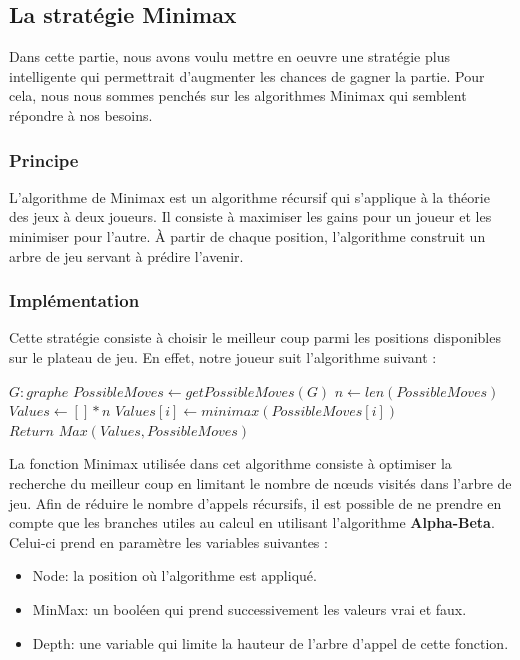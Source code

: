 \documentclass{article}
\begin{document}
\subsection{La stratégie Minimax}
Dans cette partie, nous avons voulu mettre en oeuvre une stratégie plus intelligente qui permettrait d'augmenter les chances de gagner la partie. Pour cela, nous nous sommes penchés sur les algorithmes Minimax qui semblent répondre à nos besoins. 
\subsubsection{Principe}
L'algorithme de Minimax est un algorithme récursif qui s'applique à la théorie des jeux à deux joueurs. Il consiste à maximiser les gains pour un joueur et les minimiser pour l'autre. À partir de chaque position, l'algorithme construit un arbre de jeu servant à prédire l'avenir.
\subsubsection{Implémentation}
\vspace{6pt}

Cette stratégie consiste à choisir le meilleur coup parmi les positions disponibles sur le plateau de jeu. En effet, notre joueur suit l'algorithme suivant :
\vspace{6pt}

\begin{algorithm}[H]
\caption{$Minimax Player$}
\begin{algorithmic}
\REQUIRE $G: graphe$
\STATE $PossibleMoves \leftarrow getPossibleMoves(G)$
\STATE $n \leftarrow len(PossibleMoves)$
\STATE $Values \leftarrow [ ] * n$
\STATE $Values[i] \leftarrow minimax(PossibleMoves[i])$
\ENDFOR
\STATE $Return \hspace{4pt} Max(Values, PossibleMoves)$
\end{algorithmic}
\end{algorithm}
La fonction Minimax utilisée dans cet algorithme consiste à optimiser la recherche du meilleur coup en limitant le nombre de nœuds visités dans l'arbre de jeu. Afin de réduire le nombre d'appels récursifs, il est possible de ne prendre en compte que les branches utiles au calcul en utilisant l'algorithme \textbf{Alpha-Beta}. Celui-ci prend en paramètre les variables suivantes :
\begin{itemize}
\item Node: la position où l'algorithme est appliqué.
\item MinMax: un booléen qui prend successivement les valeurs vrai et faux.
\item Depth: une variable qui limite la hauteur de l'arbre d'appel de cette fonction.
\end{itemize}
\end{document}
